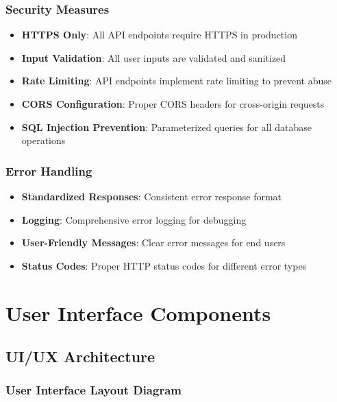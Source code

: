 \documentclass[12pt,a4paper]{article}
\begin{document}
\subsubsection{Security Measures}
\begin{itemize}
    \item \textbf{HTTPS Only}: All API endpoints require HTTPS in production
    \item \textbf{Input Validation}: All user inputs are validated and sanitized
    \item \textbf{Rate Limiting}: API endpoints implement rate limiting to prevent abuse
    \item \textbf{CORS Configuration}: Proper CORS headers for cross-origin requests
    \item \textbf{SQL Injection Prevention}: Parameterized queries for all database operations
\end{itemize}

\subsubsection{Error Handling}
\begin{itemize}
    \item \textbf{Standardized Responses}: Consistent error response format
    \item \textbf{Logging}: Comprehensive error logging for debugging
    \item \textbf{User-Friendly Messages}: Clear error messages for end users
    \item \textbf{Status Codes}: Proper HTTP status codes for different error types
\end{itemize}

\section{User Interface Components}

\subsection{UI/UX Architecture}

\subsubsection{User Interface Layout Diagram}
\end{document}
